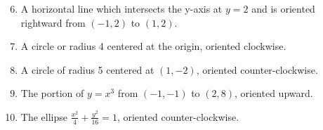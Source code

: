 \documentclass[12pt]{article}
\newif\ifans
\begin{document}
\begin{enumerate}
\setcounter{enumi}{5}

\item A horizontal line which intersects the y-axis at $y=2$ and is oriented rightward from $(-1,2)$ to $(1,2)$. 

\ifans{\fbox{$\left\{\begin{array}{l}
x=t\\
y=2\\
-1\leq t\leq 1\end{array}\right.$}} \fi

\item A circle or radius 4 centered at the origin, oriented clockwise.  

\ifans{\fbox{$\left\{\begin{array}{l}
x=4\sin{t}\\
y=4\cos{t}\\
0\leq t\leq 2\pi\end{array}\right.$}} \fi

\item A circle of radius 5 centered at $(1,-2)$, oriented counter-clockwise. 

\ifans{\fbox{$\left\{\begin{array}{l}
x=5\cos{t}+1\\
y=5\sin{t}-2\\
0\leq t\leq 2\pi \end{array}\right.$; Detailed Solution: \textcolor{blue}{\href{http://www.math.drexel.edu/classes/Calculus/resources/Math122HW/Solutions/122_17_Parametric_08.pdf}{Here}} }} \fi

\item The portion of $y=x^3$ from $(-1,-1)$ to $(2,8)$, oriented upward. 

\ifans{\fbox{$\left\{\begin{array}{l}
x=t\\
y=t^3\\
-1\leq t\leq 2\end{array}\right.$}} \fi

\newpage

\item The ellipse $\frac{x^2}{4}+\frac{y^2}{16}=1$, oriented counter-clockwise. 

\ifans{\fbox{$\left\{\begin{array}{l}
x=2\cos{t}\\
y=4\sin{t}\\
0\leq t\leq 2\pi\end{array}\right.$}} \fi

\end{enumerate}
\end{document}
